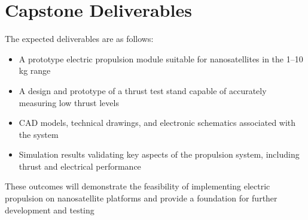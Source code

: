 \section{Capstone Deliverables}

The expected deliverables are as follows:

\begin{itemize}
    \item A prototype electric propulsion module suitable for nanosatellites in the 1–10 kg range
    \item A design and prototype of a thrust test stand capable of accurately measuring low thrust levels
    \item CAD models, technical drawings, and electronic schematics associated with the system
    \item Simulation results validating key aspects of the propulsion system, including thrust and electrical performance
\end{itemize}

These outcomes will demonstrate the feasibility of implementing electric propulsion on nanosatellite platforms and provide a foundation for further development and testing	